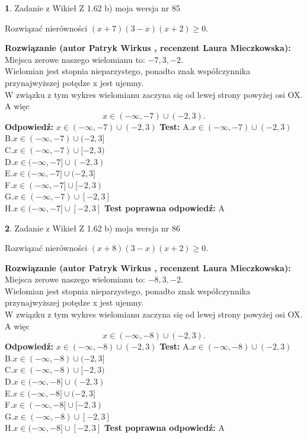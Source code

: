 \documentclass[12pt, a4paper]{article}
\theoremstyle{definition} %
\newtheorem{zad}{}
\newcommand{\zadStart}[1]{\begin{zad}#1\newline}
\newcommand{\zadStop}{\end{zad}}
\newcommand{\rozwStart}[2]{\noindent \textbf{Rozwiązanie (autor #1 , recenzent #2): }\newline}
\newcommand{\rozwStop}{\newline}
\newcommand{\odpStart}{\noindent \textbf{Odpowiedź:}\newline}
\newcommand{\odpStop}{\newline}
\newcommand{\testStart}{\noindent \textbf{Test:}\newline}
\newcommand{\testStop}{\newline}
\newcommand{\kluczStart}{\noindent \textbf{Test poprawna odpowiedź:}\newline}
\newcommand{\kluczStop}{\newline}
\begin{document}
\zadStart{Zadanie z Wikieł Z 1.62 b) moja wersja nr 85}

Rozwiązać nierówności $(x+7)(3-x)(x+2)\ge0$.
\zadStop
\rozwStart{Patryk Wirkus}{Laura Mieczkowska}
Miejsca zerowe naszego wielomianu to: $-7, 3, -2$.\\
Wielomian jest stopnia nieparzystego, ponadto znak współczynnika przy\linebreak najwyższej potędze x jest ujemny.\\ W związku z tym wykres wielomianu zaczyna się od lewej strony powyżej osi OX. A więc $$x \in (-\infty,-7) \cup (-2,3).$$
\rozwStop
\odpStart
$x \in (-\infty,-7) \cup (-2,3)$
\odpStop
\testStart
A.$x \in (-\infty,-7) \cup (-2,3)$\\
B.$x \in (-\infty,-7) \cup (-2,3]$\\
C.$x \in (-\infty,-7) \cup [-2,3)$\\
D.$x \in (-\infty,-7] \cup (-2,3)$\\
E.$x \in (-\infty,-7] \cup (-2,3]$\\
F.$x \in (-\infty,-7] \cup [-2,3)$\\
G.$x \in (-\infty,-7) \cup [-2,3]$\\
H.$x \in (-\infty,-7] \cup [-2,3]$
\testStop
\kluczStart
A
\kluczStop



\zadStart{Zadanie z Wikieł Z 1.62 b) moja wersja nr 86}

Rozwiązać nierówności $(x+8)(3-x)(x+2)\ge0$.
\zadStop
\rozwStart{Patryk Wirkus}{Laura Mieczkowska}
Miejsca zerowe naszego wielomianu to: $-8, 3, -2$.\\
Wielomian jest stopnia nieparzystego, ponadto znak współczynnika przy\linebreak najwyższej potędze x jest ujemny.\\ W związku z tym wykres wielomianu zaczyna się od lewej strony powyżej osi OX. A więc $$x \in (-\infty,-8) \cup (-2,3).$$
\rozwStop
\odpStart
$x \in (-\infty,-8) \cup (-2,3)$
\odpStop
\testStart
A.$x \in (-\infty,-8) \cup (-2,3)$\\
B.$x \in (-\infty,-8) \cup (-2,3]$\\
C.$x \in (-\infty,-8) \cup [-2,3)$\\
D.$x \in (-\infty,-8] \cup (-2,3)$\\
E.$x \in (-\infty,-8] \cup (-2,3]$\\
F.$x \in (-\infty,-8] \cup [-2,3)$\\
G.$x \in (-\infty,-8) \cup [-2,3]$\\
H.$x \in (-\infty,-8] \cup [-2,3]$
\testStop
\kluczStart
A
\kluczStop
\end{document}
